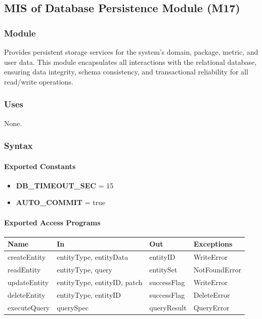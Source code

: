 \documentclass[12pt, titlepage]{article}
\begin{document}
\subsection{MIS of Database Persistence Module (M17)}
\label{mis:DatabasePersistenceModule}

\subsubsection{Module}
Provides persistent storage services for the system's domain, package, metric, and user data.
This module encapsulates all interactions with the relational database, ensuring data integrity,
schema consistency, and transactional reliability for all read/write operations.

\subsubsection{Uses}
None.

\subsubsection{Syntax}

\paragraph{Exported Constants}
\begin{itemize}
  \item \textbf{DB\_TIMEOUT\_SEC} = 15
  \item \textbf{AUTO\_COMMIT} = true
\end{itemize}

\paragraph{Exported Access Programs}
\begin{center}
\renewcommand{\arraystretch}{1.2}
\begin{tabularx}{\textwidth}{l X X l}
\toprule
\textbf{Name} & \textbf{In} & \textbf{Out} & \textbf{Exceptions}\\
\midrule
createEntity & entityType, entityData & entityID & WriteError \\
readEntity & entityType, query & entitySet & NotFoundError \\
updateEntity & entityType, entityID, patch & successFlag & WriteError \\
deleteEntity & entityType, entityID & successFlag & DeleteError \\
executeQuery & querySpec & queryResult & QueryError \\
\bottomrule
\end{tabularx}
\end{center}
\end{document}
